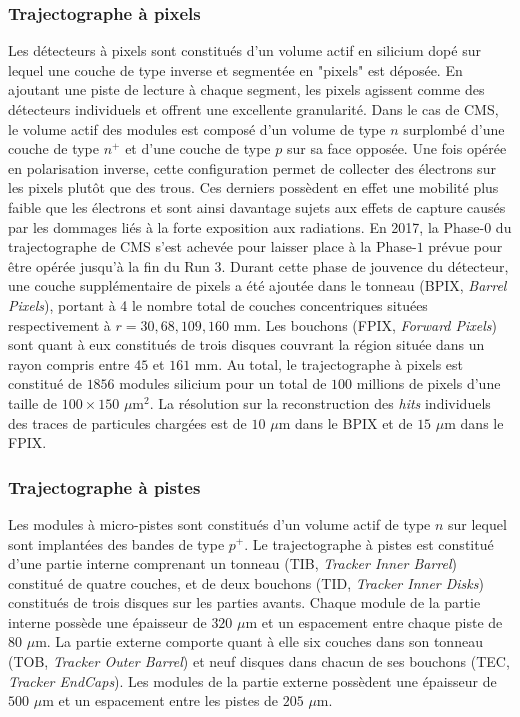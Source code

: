 \subsubsection{ Trajectographe à pixels}

Les détecteurs à pixels sont constitués d'un volume actif en silicium dopé sur lequel une couche de type inverse et segmentée en "pixels" est déposée. En ajoutant une piste de lecture à chaque segment, les pixels agissent comme des détecteurs individuels et offrent une excellente granularité. Dans le cas de CMS, le volume actif des modules est composé d'un volume de type $n$ surplombé d'une couche de type $n^+$  et d'une couche de type $p$ sur sa face opposée. Une fois opérée en polarisation inverse, cette configuration permet de collecter des électrons sur les pixels plutôt que des trous. Ces derniers possèdent en effet une mobilité plus faible que les électrons et sont ainsi davantage sujets aux effets de capture causés par les dommages liés à la forte exposition aux radiations. En 2017, la Phase-$0$ du trajectographe de CMS s'est achevée pour laisser place à la Phase-$1$ prévue pour être opérée jusqu'à la fin du Run 3. Durant cette phase de jouvence du détecteur, une couche supplémentaire de pixels a été ajoutée dans le tonneau (BPIX, \textit{Barrel Pixels}), portant à 4 le nombre total de couches concentriques situées respectivement à $r=30,68,109,160$ mm. Les bouchons (FPIX, \textit{Forward Pixels}) sont quant à eux constitués de trois disques couvrant la région située dans un rayon compris entre $45$ et $161$ mm. Au total, le trajectographe à pixels est constitué de $1856$ modules silicium pour un total de $100$ millions de pixels d'une taille de $100\times150$ $\mu$m$^2$. La résolution sur la reconstruction des \textit{hits} individuels des traces de particules chargées est de $10$ $\mu$m dans le BPIX et de $15$ $\mu$m dans le FPIX.

\subsubsection{ Trajectographe à pistes}

Les modules à micro-pistes sont constitués d'un volume actif de type $n$ sur lequel sont implantées des bandes de type $p^+$. Le trajectographe à pistes est constitué d'une partie interne comprenant un tonneau (TIB, \textit{Tracker Inner Barrel}) constitué de quatre couches, et de deux bouchons (TID, \textit{Tracker Inner Disks}) constitués de trois disques sur les parties avants. Chaque module de la partie interne possède une épaisseur de $320$ $\mu$m et un espacement entre chaque piste de $80$ $\mu$m. La partie externe comporte quant à elle six couches dans son tonneau (TOB, \textit{Tracker Outer Barrel}) et neuf disques dans chacun de ses bouchons (TEC, \textit{Tracker EndCaps}). Les modules de la partie externe possèdent une épaisseur de $500$ $\mu$m et un espacement entre les pistes de $205$ $\mu$m. \\

